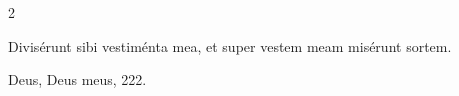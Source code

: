 \documentclass[9pt,twoside]{extarticle}
\begin{document}
\begin{multicols}{2}
\begin{tightlist}{}
\item {} Divisérunt sibi vestiménta mea, et super vestem meam misérunt sortem.
\item {} Deus, Deus meus, 222.
\end{tightlist}

%
%
%
%
%
%
%
%
%
%
%
%
%
%
%
%
%
%
%
%
%
%
%

\end{multicols}
\end{document}
